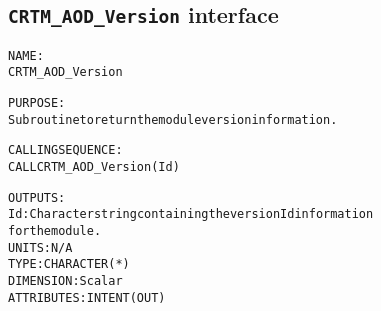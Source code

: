 \subsection{\texttt{CRTM\_AOD\_Version} interface}
  \label{sec:CRTM_AOD_Version_interface}
  \begin{alltt}
 
  NAME:
        CRTM_AOD_Version
 
  PURPOSE:
        Subroutine to return the module version information.
 
  CALLING SEQUENCE:
        CALL CRTM_AOD_Version( Id )
 
  OUTPUTS:
        Id:            Character string containing the version Id information
                       for the module.
                       UNITS:      N/A
                       TYPE:       CHARACTER(*)
                       DIMENSION:  Scalar
                       ATTRIBUTES: INTENT(OUT)
 
  \end{alltt}
